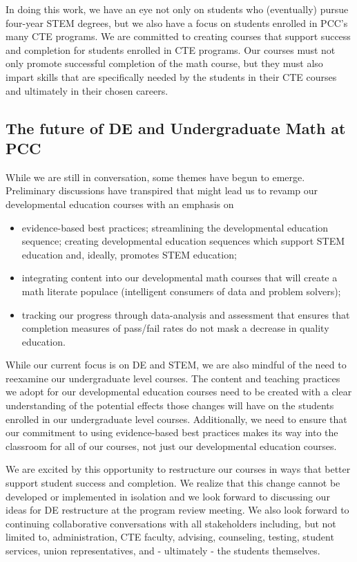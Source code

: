 In doing this work, we have an eye not only on students who (eventually)
pursue four-year STEM degrees, but we also have a focus on students enrolled in
PCC's many CTE programs.  We are committed to creating courses that support
success and completion for students enrolled in CTE programs.  Our courses must
not only promote successful completion of the math course, but they must also
impart skills that are specifically needed by the students in their CTE
courses and ultimately in their chosen careers.

\subsection{The future of DE and Undergraduate Math at PCC}
While we are still in conversation, some themes have begun to emerge.
Preliminary discussions have transpired that might lead us to
revamp our developmental education courses with an emphasis on 
\begin{itemize}
  \item evidence-based best practices;
streamlining the developmental education sequence;
creating developmental education sequences which support STEM education and,
ideally, promotes STEM education; 
\item integrating content into our developmental math
courses that will create a math literate populace (intelligent consumers of data
and problem solvers);
\item tracking our progress through data-analysis and assessment that ensures that
completion measures of  pass/fail rates do not mask a decrease in quality
education.
\end{itemize}

While our current focus is on DE and STEM, we are also mindful of the need to
reexamine our undergraduate level courses. The content and teaching practices we
adopt for our developmental  education courses need to be created with a clear
understanding of the potential effects those changes will have on the students
enrolled in our undergraduate level courses. Additionally, we need to ensure
that our commitment to using evidence-based best practices makes its way into
the classroom for all of our courses, not just our developmental education
courses.

We are excited by this opportunity to restructure our courses in ways that
better support student success and completion. We realize that this change
cannot be developed or implemented in isolation and we look forward to
discussing our ideas for DE restructure at the program review meeting. We also look
forward to continuing collaborative conversations with all
stakeholders including, but not limited to, administration, CTE faculty,
advising, counseling, testing, student services, union representatives, and -
ultimately - the students themselves.

